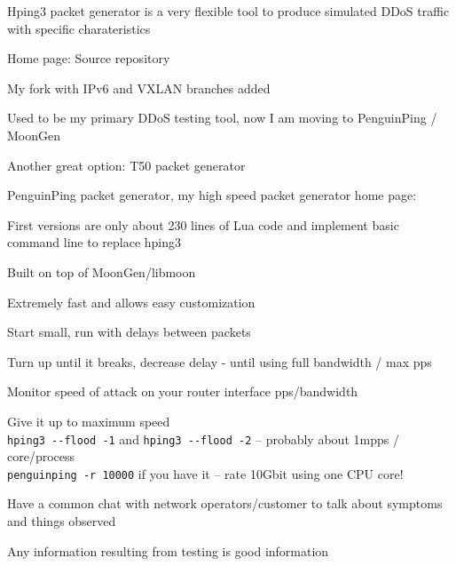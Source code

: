 \documentclass[Screen16to9,17pt]{foils}
\begin{document}
\begin{list2}
\item Hping3 packet generator is a very flexible tool to produce simulated DDoS traffic with specific charateristics
\item Home page:  Source repository 
\item My fork with IPv6 and VXLAN branches added 
\item Used to be my primary DDoS testing tool, now I am moving to PenguinPing / MoonGen
\item Another great option: T50 packet generator 
\end{list2}




\begin{list2}
\item PenguinPing packet generator, my high speed packet generator
home page: 
\item First versions are only about 230 lines of Lua code and implement basic command line to replace hping3
\item Built on top of MoonGen/libmoon 
\end{list2}

\centerline{Extremely fast and allows easy customization}



\begin{list2}
\item Start small, run with delays between packets
\item Turn up until it breaks, decrease delay - until using full bandwidth / max pps
\item Monitor speed of attack on your router interface pps/bandwidth
\item Give it up to maximum speed\\
 \verb+hping3 --flood -1+ and \verb+hping3 --flood -2+ -- probably about 1mpps / core/process\\
 \verb+penguinping -r 10000+ if you have it -- rate 10Gbit using one CPU core!
\item Have a common chat with network operators/customer to talk about symptoms and things observed
\item Any information resulting from testing is good information
\end{list2}
\end{document}
